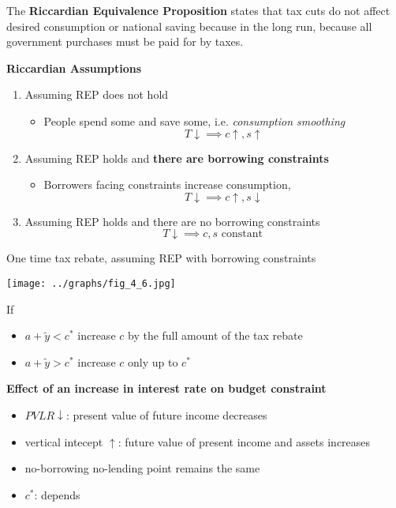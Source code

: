\documentclass[letterpaper, 9pt,landscape]{extarticle}
\begin{document}
\begin{multicols*}{5}
\begin{theorem}
    The \textbf{Riccardian Equivalence Proposition} states that tax cuts do not affect desired consumption or national saving because in the long run, because all government purchases must be paid for by taxes. 
\end{theorem}

\begin{remark}
    \textbf{Riccardian Assumptions}
    \begin{enumerate}
        \item Assuming REP does not hold 
        \begin{itemize}
            \item People spend some and save some, i.e. \textit{consumption smoothing}
            \[
            T \downarrow \implies c \uparrow, s \uparrow
            \]
        \end{itemize} 
        \item Assuming REP holds and \textbf{there are borrowing constraints}
        \begin{itemize}
            \item Borrowers facing constraints increase consumption, 
            \[
            T \downarrow \implies c \uparrow, s \downarrow
            \]
        \end{itemize}
        \item Assuming REP holds and there are no borrowing constraints 
        \[
        T \downarrow \implies c, s \text{ constant }
        \]
    \end{enumerate}
\end{remark}


\begin{remark}
    One time tax rebate, assuming REP with borrowing constraints
    
    \begin{center}
    \texttt{[image: ../graphs/fig\_4\_6.jpg]}
    \end{center}

    If 
    \begin{itemize}
        \item $a + \tilde{y} < c^*$ increase $c$ by the full amount of the tax rebate
        \item $a + \tilde{y} > c^*$ increase $c$ only up to $c^*$
    \end{itemize} 
\end{remark}


\begin{remark}
    \textbf{Effect of an increase in interest rate on budget constraint}  
    \begin{itemize}
        \item $PVLR \downarrow$: present value of future income decreases
        \item vertical intecept $\uparrow$: future value of present income and assets increases 
        \item no-borrowing no-lending point remains the same 
        \item $c^*$: depends
    \end{itemize} 


\end{remark}
\end{multicols*}
\end{document}
